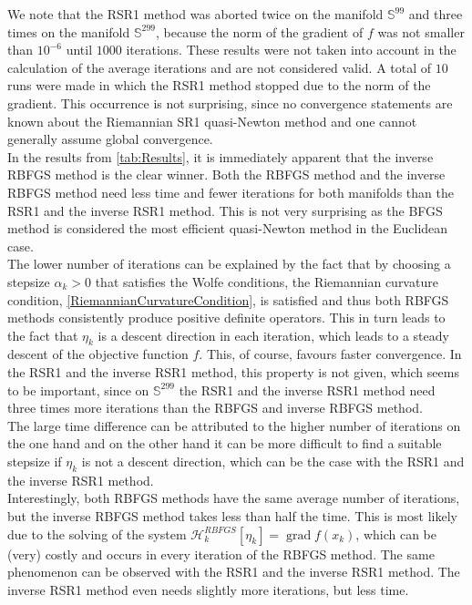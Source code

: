 We note that the RSR1 method was aborted twice on the manifold $\mathbb{S}^{99}$ and three times on the manifold $\mathbb{S}^{299}$, because the norm of the gradient of $f$ was not smaller than $10^{-6}$ until $1000$ iterations. These results were not taken into account in the calculation of the average iterations and are not considered valid. A total of $10$ runs were made in which the RSR1 method stopped due to the norm of the gradient. This occurrence is not surprising, since no convergence statements are known about the Riemannian SR1 quasi-Newton method and one cannot generally assume global convergence. \\
In the results from \cref{tab:Results}, it is immediately apparent that the inverse RBFGS method is the clear winner. Both the RBFGS method and the inverse RBFGS method need less time and fewer iterations for both manifolds than the RSR1 and the inverse RSR1 method. This is not very surprising as the BFGS method is considered the most efficient quasi-Newton method in the Euclidean case. \\
The lower number of iterations can be explained by the fact that by choosing a stepsize $\alpha_k > 0$ that satisfies the Wolfe conditions, the Riemannian curvature condition, \cref{RiemannianCurvatureCondition}, is satisfied and thus both RBFGS methods consistently produce positive definite operators. This in turn leads to the fact that $\eta_k$ is a descent direction in each iteration, which leads to a steady descent of the objective function $f$. This, of course, favours faster convergence. In the RSR1 and the inverse RSR1 method, this property is not given, which seems to be important, since on $\mathbb{S}^{299}$ the RSR1 and the inverse RSR1 method need three times more iterations than the RBFGS and inverse RBFGS method. \\
The large time difference can be attributed to the higher number of iterations on the one hand and on the other hand it can be more difficult to find a suitable stepsize if $\eta_k$ is not a descent direction, which can be the case with the RSR1 and the inverse RSR1 method. \\
Interestingly, both RBFGS methods have the same average number of iterations, but the inverse RBFGS method takes less than half the time. This is most likely due to the solving of the system $\mathcal{H}^{RBFGS}_k [\eta_k] = \operatorname{grad} f(x_k)$, which can be (very) costly and occurs in every iteration of the RBFGS method. The same phenomenon can be observed with the RSR1 and the inverse RSR1 method. The inverse RSR1 method even needs slightly more iterations, but less time.
